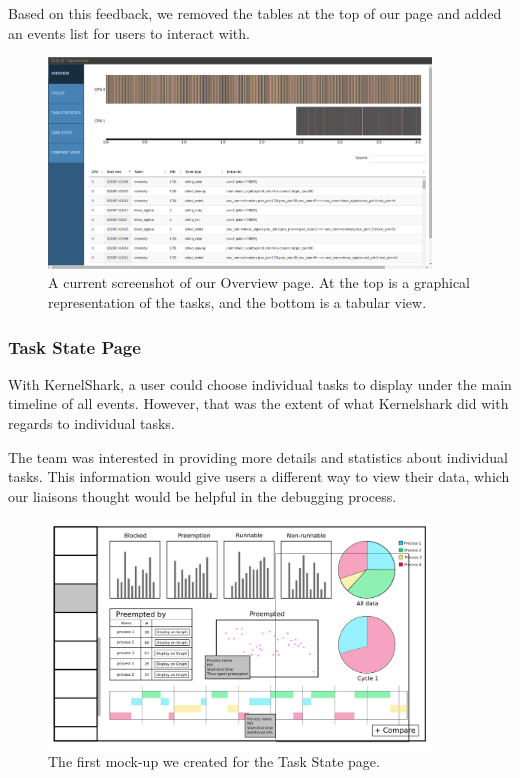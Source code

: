 \documentclass{hmcclinic}
\begin{document}
Based on this feedback, we removed the tables at the top of our page and added
an events list for users to interact with.

\begin{figure}[H]
\begin{center}
\includegraphics[width=4in]{overview-page.png}
\caption{A current screenshot of our Overview page. At the top is a graphical
representation of the tasks, and the bottom is a tabular view.}
\end{center}
\end{figure}

\subsubsection{Task State Page}

With KernelShark, a user could choose individual tasks to display under
the main timeline of all events. However, that was the extent of what
Kernelshark did with regards to individual tasks.

The team was interested in providing more details and statistics about
individual tasks. This information would give users a different way to view
their data, which our liaisons thought would be helpful
in the debugging process.

\begin{figure}[H]
\begin{center}
\includegraphics[width=4in]{perProcess-49.png}
\caption{The first mock-up we created for the Task State page.}
\end{center}
\end{figure}
\end{document}
